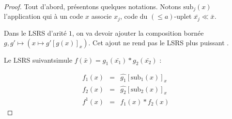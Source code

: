 \documentclass{report}
\newcommand{\leqa}{\left( \leqslant a \right)}
\begin{document}
	\begin{proof}
		Tout d'abord, présentons quelques notations. Notons $\text{sub}_j(x)$ l'application qui à un code $x$ associe $x_j$, code du $\leqa$-uplet $\bar{x_j} \ll \bar{x}$. 
		
		
		Dans le LSRS d'arité $1$, on va devoir ajouter la composition bornée $g,g' \mapsto \left(x \mapsto g'\left[ g(x)\right]_x\right)$. Cet ajout ne rend pas le LSRS plus puissant \cite{GrandjeanSchwentick2002}. 
		
		Le LSRS suivant\footnotemark  simule $f\left(\bar{x}\right) = g_1\left(\bar{x_1}\right) * g_2\left(\bar{x_2}\right)$ :
			
		
		\begin{eqnarray}
			f_1(x) & = & \hat{g_1}\left[ \text{sub}_1(x) \right]_x \\
			f_2(x) & = & \hat{g_2}\left[ \text{sub}_2(x) \right]_x \\
			f^1(x) & = & f_1(x) * f_2(x) 
		\end{eqnarray}
	\end{proof}
	
\end{document}
